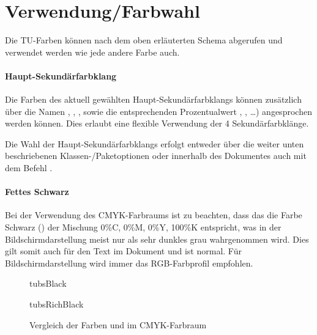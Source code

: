 \clearpage
\section{Verwendung/Farbwahl}
\sloppy


Die TU-Farben können nach dem oben erläuterten Schema abgerufen und verwendet
werden wie jede andere Farbe auch.

\paragraph{Haupt-Sekundärfarbklang}\label{sec:secondary}

Die Farben des aktuell gewählten Haupt-Sekundärfarbklangs können zusätzlich
über die Namen ,
, , sowie die
entsprechenden Prozentualwert ,
, \ldots) angesprochen werden können.
Dies erlaubt eine flexible Verwendung der 4 Sekundärfarbklänge.

Die Wahl der Haupt-Sekundärfarbklangs erfolgt entweder über die weiter
unten beschriebenen Klassen-/Paketoptionen oder innerhalb des Dokumentes auch
mit dem Befehl .

\paragraph{Fettes Schwarz}\label{sec:richblack}

Bei der Verwendung des CMYK-Farbraums ist zu beachten,
dass das die Farbe Schwarz ()
der Mischung 0\%C, 0\%M, 0\%Y, 100\%K entspricht,
was in der Bildschirmdarstellung meist nur als sehr dunkles grau wahrgenommen wird.
Dies gilt somit auch für den Text im Dokument und ist normal.
Für Bildschirmdarstellung wird immer das RGB-Farbprofil empfohlen.

\begin{figure}[!ht]
\centering
{
\colorbox[cmyk]{0,0,0,1}{\parbox[t][2cm]{3cm}{\vfill\centering\sffamily\color{tubsWhite} tubsBlack\vfill}}%
\qquad
\colorbox[cmyk]{0.75,0.68,0.67,0.9}{\parbox[t][2cm]{3cm}{\vfill\centering\sffamily\color{tubsWhite} tubsRichBlack\vfill}}%
}
\caption{Vergleich der Farben  und  im CMYK-Farbraum}
\end{figure}


